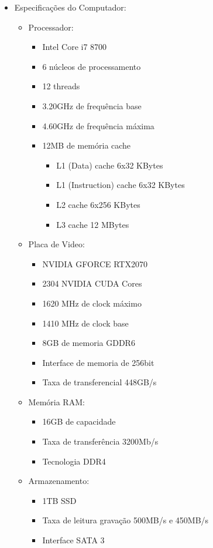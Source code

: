 \begin{itemize}
	\item Especificações do Computador:
	\begin{itemize}
		\item Processador:
		\begin{itemize}
			\item Intel Core i7 8700
			\item 6 núcleos de processamento
			\item 12 threads
			\item 3.20GHz de frequência base
			\item 4.60GHz de frequência máxima
			\item 12MB de memória cache
			\begin{itemize}
				\item L1 (Data) cache 6x32 KBytes
				\item L1 (Instruction) cache 6x32 KBytes
				\item L2 cache 6x256 KBytes
				\item L3 cache 12 MBytes 
			\end{itemize}
		\end{itemize}
	\end{itemize}
	
	\begin{itemize}
		\item Placa de Video:
		\begin{itemize}
			\item NVIDIA GFORCE RTX2070
			\item 2304 NVIDIA CUDA Cores 
			\item 1620 MHz de clock máximo
			\item 1410 MHz de clock base
			\item 8GB de memoria GDDR6
			\item Interface de memoria de 256bit
			\item Taxa de transferencial 448GB/s 
		\end{itemize}
	\end{itemize}
	
	\begin{itemize}
		\item Memória RAM:
		\begin{itemize}
			\item 16GB de capacidade
			\item Taxa de transferência 3200Mb/s 
			\item Tecnologia DDR4
		\end{itemize}
	\end{itemize}
	
	\begin{itemize}
		\item Armazenamento:
		\begin{itemize}
			\item 1TB SSD
			\item Taxa de leitura gravação 500MB/s e 450MB/s
			\item Interface SATA 3
		\end{itemize}
	\end{itemize}
\end{itemize}

